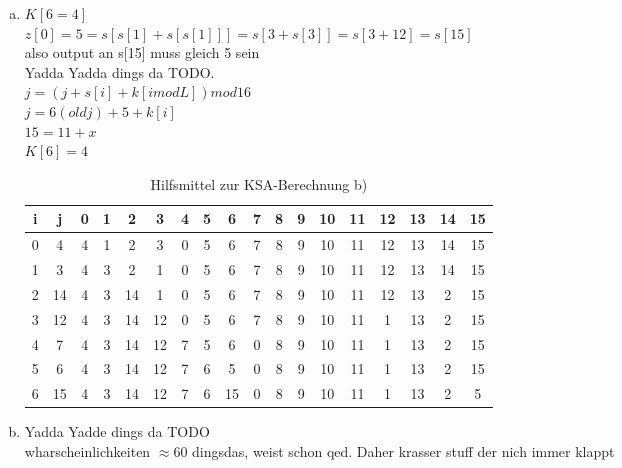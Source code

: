 \documentclass[12pt.twoside,a4paper,notitlepage]{article}
\begin{document}
\begin{enumerate}[a)]
\item $K[6=4]$\\
$z[0]=5=s[s[1]+s[s[1]]]=s[3+s[3]]=s[3+12]=s[15]$\\
also output an s[15] muss gleich 5 sein\\
Yadda Yadda dings da TODO. \\
$j = (j + s[i] + k[i mod L]) mod 16 $\\
$j = 6(old j) + 5 + k[i]$ \\
$15 = 11 + x$\\
$K[6] = 4 $
\begin{table}[h]
\centering
\begin{tabular}{|c|c||c|c|c|c|c|c|c|c|c|c|c|c|c|c|c|c|}
\hline
i & j & 0 & 1 & 2 & 3 & 4 & 5 & 6 & 7 & 8 & 9 & 10 & 11 & 12 & 13 & 14 & 15 \\
\hline
0 & 4 & 4 & 1 & 2 & 3 & 0 & 5 & 6 & 7 & 8 & 9 & 10 & 11 & 12 & 13 & 14 & 15 \\
\hline
1 & 3 & 4 & 3 & 2 & 1 & 0 & 5 & 6 & 7 & 8 & 9 & 10 & 11 & 12 & 13 & 14 & 15 \\
\hline
2 & 14 & 4 & 3 & 14 & 1 & 0 & 5 & 6 & 7 & 8 & 9 & 10 & 11 & 12 & 13 & 2 & 15 \\
\hline
3 & 12 & 4 & 3 & 14 & 12 & 0 & 5 & 6 & 7 & 8 & 9 & 10 & 11 & 1 & 13 & 2 & 15 \\
\hline
4 & 7 & 4 & 3 & 14 & 12 & 7 & 5 & 6 & 0 & 8 & 9 & 10 & 11 & 1 & 13 & 2 & 15 \\
\hline
5 & 6 & 4 & 3 & 14 & 12 & 7 & 6 & 5 & 0 & 8 & 9 & 10 & 11 & 1 & 13 & 2 & 15 \\
\hline
6 & 15 & 4 & 3 & 14 & 12 & 7 & 6 & 15 & 0 & 8 & 9 & 10 & 11 & 1 & 13 & 2 & 5 \\
\hline
\end{tabular}
\caption{Hilfsmittel zur KSA-Berechnung b)}
\label{tab:ksa}
\end{table}

\item Yadda Yadde dings da TODO\\
wharscheinlichkeiten $\approx  60$ dingsdas, weist schon qed.
Daher krasser stuff der nich immer klappt
\end{enumerate}
\end{document}
